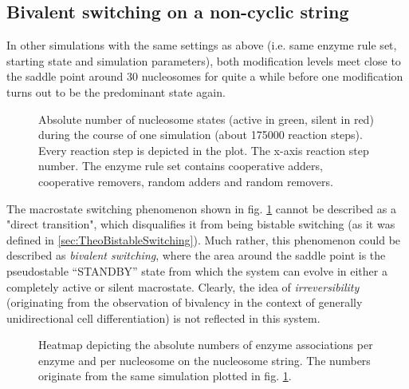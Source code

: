         \subsection{Bivalent switching on a non-cyclic string}

            In other simulations with the same settings as above (i.e. same enzyme rule set, starting state and simulation parameters), both modification levels meet close to the saddle point around 30 nucleosomes for quite a while before one modification turns out to be the predominant state again.

            \begin{figure}[htpb!]
                \centering
                \caption{Absolute number of nucleosome states (active in green, silent in red) during the course of one simulation (about 175000 reaction steps). Every reaction step is depicted in the plot. The x-axis reaction step number. The enzyme rule set contains cooperative adders, cooperative removers, random adders and random removers.}
                \label{img:nonCyclBistability_runPlot3}
            \end{figure}

            The macrostate switching phenomenon shown in fig. \ref{img:nonCyclBistability_runPlot3} cannot be described as a "direct transition", which disqualifies it from being bistable switching (as it was defined in \ref{sec:TheoBistableSwitching}). Much rather, this phenomenon could be described as \textit{bivalent switching}, where the area around the saddle point is the pseudostable “STANDBY” state from which the system can evolve in either a completely active or silent macrostate. Clearly, the idea of \textit{irreversibility} (originating from the observation of bivalency in the context of generally unidirectional cell differentiation) is not reflected in this system.

            \begin{figure}[htpb!]
                \centering
                \caption{Heatmap depicting the absolute numbers of enzyme associations per enzyme and per nucleosome on the nucleosome string. The numbers originate from the same simulation plotted in fig. \ref{img:nonCyclBistability_runPlot3}.}
                \label{img:coopAssocBindingNumbers_runPot3}
            \end{figure}

